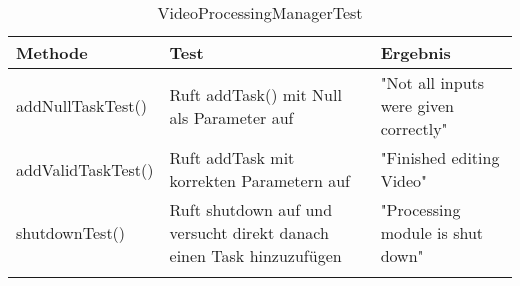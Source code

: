  \begin{longtable}{p{} | p{} | p{}}
\hline
  \textbf{Methode} & \textbf{Test} & \textbf{Ergebnis}\\
  \hline
  addNullTaskTest() & Ruft addTask() mit Null als Parameter auf & "Not all inputs were given correctly"\\
  \hline
  addValidTaskTest() & Ruft addTask mit korrekten Parametern auf & "Finished editing Video"\\
  \hline
  shutdownTest() & Ruft shutdown auf und versucht direkt danach einen Task hinzuzufügen & "Processing module is shut down"\\
  \hline
  \caption{VideoProcessingManagerTest}
 \end{longtable}